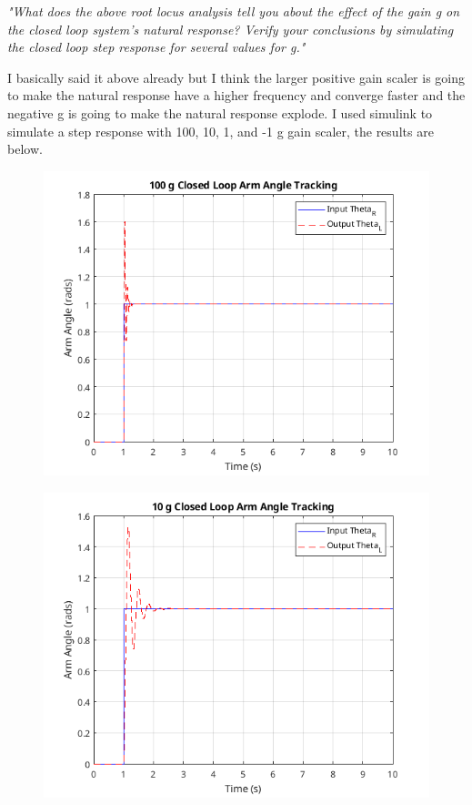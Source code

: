 \documentclass{article}
\begin{document}
\textit{
    "What does the above root locus analysis tell you about the effect of the gain g on the closed
    loop system’s natural response? Verify your conclusions by simulating the closed loop step
    response for several values for g."
}

I basically said it above already but I think the larger positive gain scaler is going to make the natural response have a higher frequency and converge faster and the negative g is going to make the natural response explode.
I used simulink to simulate a step response with 100, 10, 1, and -1 g gain scaler, the results are below.

\begin{figure}[H]
    \centering
    \includegraphics[width=\textwidth]{100gStep.png}
\end{figure}
\begin{figure}[H]
    \centering
    \includegraphics[width=\textwidth]{10gStep.png}
\end{figure}
\end{document}
